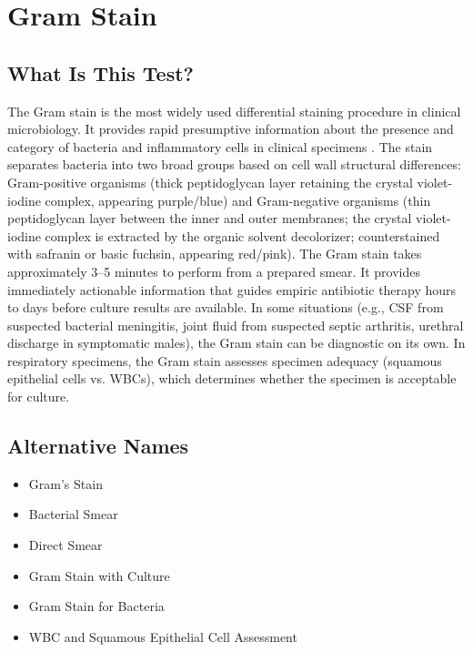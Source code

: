 \chapter{Gram Stain}

\section*{What Is This Test?}
The Gram stain is the most widely used differential staining procedure in clinical microbiology. It provides rapid presumptive information about the presence and category of bacteria and inflammatory cells in clinical specimens \cite{forbes2019bailey}. The stain separates bacteria into two broad groups based on cell wall structural differences: Gram-positive organisms (thick peptidoglycan layer retaining the crystal violet-iodine complex, appearing purple/blue) and Gram-negative organisms (thin peptidoglycan layer between the inner and outer membranes; the crystal violet-iodine complex is extracted by the organic solvent decolorizer; counterstained with safranin or basic fuchsin, appearing red/pink). The Gram stain takes approximately 3--5 minutes to perform from a prepared smear. It provides immediately actionable information that guides empiric antibiotic therapy hours to days before culture results are available. In some situations (e.g., CSF from suspected bacterial meningitis, joint fluid from suspected septic arthritis, urethral discharge in symptomatic males), the Gram stain can be diagnostic on its own. In respiratory specimens, the Gram stain assesses specimen adequacy (squamous epithelial cells vs. WBCs), which determines whether the specimen is acceptable for culture.

\section*{Alternative Names}
\begin{itemize}
  \item Gram's Stain
  \item Bacterial Smear
  \item Direct Smear
  \item Gram Stain with Culture
  \item Gram Stain for Bacteria
  \item WBC and Squamous Epithelial Cell Assessment
\end{itemize}
